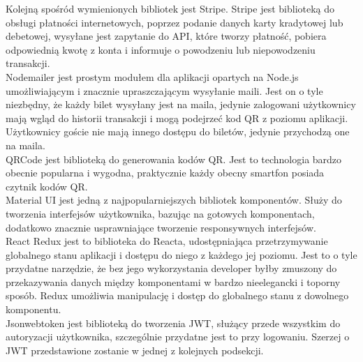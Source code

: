 \documentclass[12pt]{article}
\begin{document}
\begin{sloppypar}
{{    Kolejną spośród wymienionych bibliotek jest Stripe. Stripe jest biblioteką do obsługi płatności internetowych, poprzez podanie danych karty kradytowej lub debetowej, 
    wysyłane jest zapytanie do API, które tworzy płatność, pobiera odpowiednią kwotę z konta i informuje o powodzeniu lub niepowodzeniu transakcji.\\
 
    Nodemailer jest prostym modułem dla aplikacji opartych na Node.js umożliwiającym i znacznie upraszczającym wysyłanie maili. Jest on o tyle niezbędny, że każdy bilet wysyłany jest na maila, 
    jedynie zalogowani użytkownicy mają wgląd do historii transakcji i mogą podejrzeć kod QR z poziomu aplikacji. Użytkownicy goście nie mają innego dostępu do biletów, jedynie 
    przychodzą one na maila.\\
 
    QRCode jest biblioteką do generowania kodów QR. Jest to technologia bardzo obecnie popularna i wygodna, praktycznie każdy obecny smartfon posiada czytnik kodów QR.\\
 
    Material UI jest jedną z najpopularniejszych bibliotek komponentów. Służy do tworzenia interfejsów użytkownika, bazując na gotowych komponentach, dodatkowo znacznie 
    usprawniające tworzenie responsywnych interfejsów.\\
 
    React Redux jest to biblioteka do Reacta, udostępniająca przetrzymywanie globalnego stanu aplikacji i dostępu do niego z każdego jej poziomu. Jest to o tyle przydatne 
    narzędzie, że bez jego wykorzystania developer byłby zmuszony do przekazywania danych między komponentami w bardzo nieelegancki i toporny sposób. Redux umożliwia 
    manipulację i dostęp do globalnego stanu z dowolnego komponentu.\\
 
    Jsonwebtoken jest biblioteką do tworzenia JWT, służący przede wszystkim do autoryzacji użytkownika, szczególnie przydatne jest to przy logowaniu. Szerzej o JWT 
    przedstawione zostanie w jednej z kolejnych podsekcji.\\
  }
}
\end{sloppypar}
\end{document}

